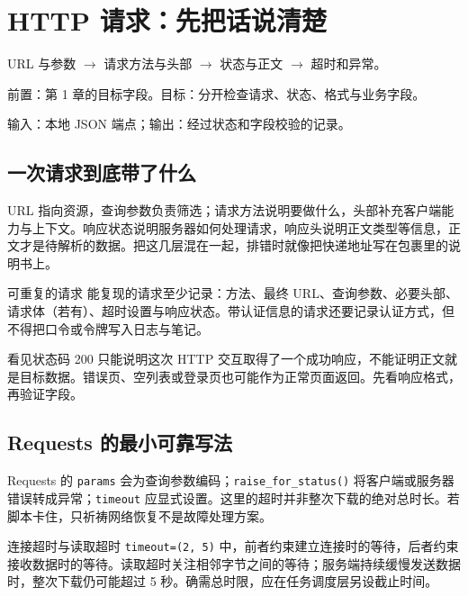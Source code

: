 \chapter{HTTP 请求：先把话说清楚}\label{ch:http}
\begin{tcolorbox}[title=章首知识地图,colframe=Ink]
URL 与参数 $\longrightarrow$ 请求方法与头部 $\longrightarrow$ 状态与正文 $\longrightarrow$ 超时和异常。
\end{tcolorbox}

\begin{tcolorbox}[title=学习目标与前置知识,colframe=Ink!65,colback=Ink!2]
前置：第 1 章的目标字段。目标：分开检查请求、状态、格式与业务字段。\par
输入：本地 JSON 端点；输出：经过状态和字段校验的记录。
\end{tcolorbox}

\section{一次请求到底带了什么}
URL 指向资源，查询参数负责筛选；请求方法说明要做什么，头部补充客户端能力与上下文。响应状态说明服务器如何处理请求，响应头说明正文类型等信息，正文才是待解析的数据。把这几层混在一起，排错时就像把快递地址写在包裹里的说明书上。

\begin{definition}{可重复的请求}
能复现的请求至少记录：方法、最终 URL、查询参数、必要头部、请求体（若有）、超时设置与响应状态。带认证信息的请求还要记录认证方式，但不得把口令或令牌写入日志与笔记。
\end{definition}

\begin{warning}
看见状态码 200 只能说明这次 HTTP 交互取得了一个成功响应，不能证明正文就是目标数据。错误页、空列表或登录页也可能作为正常页面返回。先看响应格式，再验证字段。
\end{warning}

\section{Requests 的最小可靠写法}
Requests 的 \texttt{params} 会为查询参数编码；\texttt{raise\_for\_status()} 将客户端或服务器错误转成异常；\texttt{timeout} 应显式设置。这里的超时并非整次下载的绝对总时长。若脚本卡住，只祈祷网络恢复不是故障处理方案。

\begin{method}{连接超时与读取超时}
\texttt{timeout=(2, 5)} 中，前者约束建立连接时的等待，后者约束接收数据时的等待。读取超时关注相邻字节之间的等待；服务端持续缓慢发送数据时，整次下载仍可能超过 5 秒。确需总时限，应在任务调度层另设截止时间。
\end{method}

